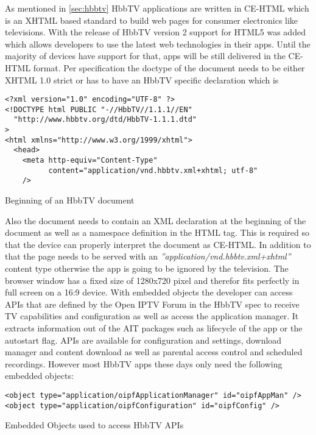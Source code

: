 As mentioned in \ref{sec:hbbtv} HbbTV applications are written in CE-HTML which is an XHTML based standard to build web pages for consumer electronics like televisions. With the release of HbbTV version 2 support for HTML5 was added which allows developers to use the latest web technologies in their apps. Until the majority of devices have support for that, apps will be still delivered in the CE-HTML format. Per specification the doctype of the document needs to be either XHTML 1.0 strict or has to have an HbbTV specific declaration which is

\vspace{1cm}
\begin{listing}[H]
\begin{verbatim}
<?xml version="1.0" encoding="UTF-8" ?>
<!DOCTYPE html PUBLIC "-//HbbTV//1.1.1//EN"
  "http://www.hbbtv.org/dtd/HbbTV-1.1.1.dtd"
>
<html xmlns="http://www.w3.org/1999/xhtml">
  <head>
    <meta http-equiv="Content-Type"
          content="application/vnd.hbbtv.xml+xhtml; utf-8"
    />
\end{verbatim}
\caption{Beginning of an HbbTV document}
\label{lst:doctype}
\end{listing}
\vspace{0.5cm}

Also the document needs to contain an XML declaration at the beginning of the document as well as a namespace definition in the HTML tag. This is required so that the device can properly interpret the document as CE-HTML. In addition to that the page needs to be served with an \textit{''application/vnd.hbbtv.xml+xhtml''} content type otherwise the app is going to be ignored by the television. The browser window has a fixed size of 1280x720 pixel and therefor fits perfectly in full screen on a 16:9 device. With embedded objects the developer can access APIs that are defined by the Open IPTV Forum in the HbbTV spec to receive TV capabilities and configuration as well as access the application manager. It extracts information out of the AIT packages such as lifecycle of the app or the autostart flag. APIs are available for configuration and settings, download manager and content download as well as parental access control and scheduled recordings. However most HbbTV apps these days only need the following embedded objects:

\vspace{1cm}
\begin{listing}[H]
\begin{verbatim}
<object type="application/oipfApplicationManager" id="oipfAppMan" />
<object type="application/oipfConfiguration" id="oipfConfig" />
\end{verbatim}
\caption{Embedded Objects used to access HbbTV APIs}
\label{lst:embeddedObjects}
\end{listing}
\vspace{0.5cm}

